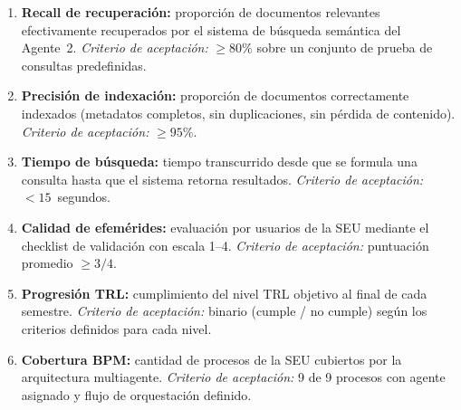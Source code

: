 \documentclass[a4paper, 12pt]{article}
\begin{document}
\begin{enumerate}[label=M\arabic*.]
  \item \textbf{Recall de recuperaci\'on:} proporci\'on de documentos relevantes efectivamente recuperados por el sistema de b\'usqueda sem\'antica del Agente~2. \textit{Criterio de aceptaci\'on:} $\geq 80\%$ sobre un conjunto de prueba de consultas predefinidas.

  \item \textbf{Precisi\'on de indexaci\'on:} proporci\'on de documentos correctamente indexados (metadatos completos, sin duplicaciones, sin p\'erdida de contenido). \textit{Criterio de aceptaci\'on:} $\geq 95\%$.

  \item \textbf{Tiempo de b\'usqueda:} tiempo transcurrido desde que se formula una consulta hasta que el sistema retorna resultados. \textit{Criterio de aceptaci\'on:} $< 15$~segundos.

  \item \textbf{Calidad de efem\'erides:} evaluaci\'on por usuarios de la \ac{SEU} mediante el checklist de validaci\'on con escala 1--4. \textit{Criterio de aceptaci\'on:} puntuaci\'on promedio $\geq 3/4$.

  \item \textbf{Progresi\'on \ac{TRL}:} cumplimiento del nivel \ac{TRL} objetivo al final de cada semestre. \textit{Criterio de aceptaci\'on:} binario (cumple / no cumple) seg\'un los criterios definidos para cada nivel.

  \item \textbf{Cobertura BPM:} cantidad de procesos de la \ac{SEU} cubiertos por la arquitectura multiagente. \textit{Criterio de aceptaci\'on:} 9 de 9 procesos con agente asignado y flujo de orquestaci\'on definido.
\end{enumerate}

\printbibliography[title={Referencias y bibliograf\'ia}]
\end{document}

